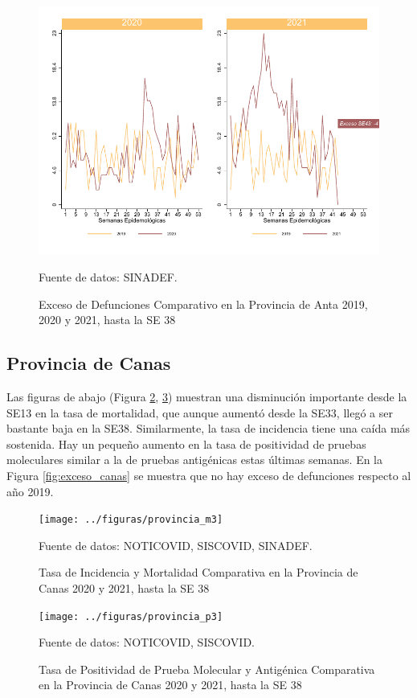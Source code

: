 \documentclass[12pt,a4paper,openany]{book}
\begin{document}
	\begin{figure}[h]
		\caption{Exceso de Defunciones Comparativo en la Provincia de Anta 2019, 2020 y 2021, hasta la SE 38}\label{fig:exceso_anta}
		\begin{center}
			\includegraphics[width=0.7\linewidth]{../figuras/exceso_2}
		\end{center}
		{\footnotesize {Fuente de datos: SINADEF.}}
	\end{figure}

		\clearpage
	
	\subsection*{Provincia de Canas}
	\noindent Las figuras de abajo (Figura \ref{fig:inc_mort_canas}, \ref{fig:positividad_canas})  muestran una disminución importante desde la SE13 en la tasa de mortalidad, que aunque aumentó desde la SE33, llegó a ser bastante baja en la SE38. Similarmente, la tasa de incidencia tiene una caída más sostenida. Hay un pequeño aumento en la tasa de positividad de pruebas moleculares similar a la de pruebas antigénicas estas últimas semanas. En la Figura \ref{fig:exceso_canas} se muestra que no hay exceso de defunciones respecto al año 2019.
	
	\begin{figure}[h]
		\caption{Tasa de Incidencia y Mortalidad Comparativa en la Provincia de Canas 2020 y 2021, hasta la SE 38}\label{fig:inc_mort_canas}
		\begin{center}
			\texttt{[image: ../figuras/provincia\_m3]}
		\end{center}
		{\footnotesize {Fuente de datos: NOTICOVID, SISCOVID, SINADEF.}}
	\end{figure}
	
	\begin{figure}[h]
		\caption{Tasa de Positividad de Prueba Molecular y Antigénica Comparativa en la Provincia de Canas 2020 y 2021, hasta la SE 38}\label{fig:positividad_canas}
		\begin{center}
			\texttt{[image: ../figuras/provincia\_p3]}
		\end{center}
		{\footnotesize {Fuente de datos: NOTICOVID, SISCOVID.}}
	\end{figure}
	
\end{document}

